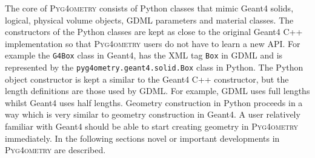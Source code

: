 \documentclass[final,5p,times,twocolumn]{elsarticle}
\newcommand{\pyinline}[1]{\lstinline[postbreak={}]{#1}}
\newcommand{\PYGEOMETRY}{\textsc{Pyg4ometry}}
\begin{document}
The core of \PYGEOMETRY{} consists of Python classes that mimic Geant4 solids, logical, physical volume objects, GDML parameters and material classes.
The constructors of the Python classes are kept as close to the original Geant4 C++ implementation so that \PYGEOMETRY{} users do not have to learn 
a new API. For example the \verb|G4Box| class in Geant4, has the XML tag \verb|Box| in GDML and is represented by the \pyinline{pyg4ometry.geant4.solid.Box} class in Python. The Python object constructor is kept a similar to the Geant4 C++ constructor, but the length definitions are those used by GDML. For example, GDML uses full lengths whilst Geant4 uses half lengths. Geometry construction in Python proceeds in a way which is very similar to geometry construction in Geant4. A user relatively familiar with Geant4 should be able to start creating geometry in \PYGEOMETRY{} immediately. In the following sections novel or important developments in \PYGEOMETRY{} are described.  
\end{document}

